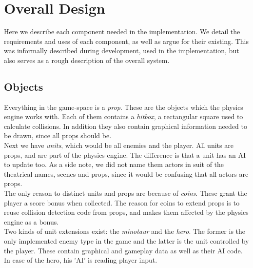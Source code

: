 \chapter{Overall Design} %
Here we describe each component needed in the implementation. We detail the requirements and uses of each component, as well as argue for their existing. This was informally described during development, used in the implementation, but also serves as a rough description of the overall system.

\section{Objects} %
Everything in the game-space is a \emph{prop}. These are the objects which the physics engine works with. Each of them contains a \emph{hitbox}, a rectangular square used to calculate collisions. In addition they also contain graphical information needed to be drawn, since all props should be.\\
Next we have \emph{units}, which would be all enemies and the player. All units are props, and are part of the physics engine. The difference is that a unit has an AI to update too. As a side note, we did not name them actors in suit of the theatrical names, scenes and props, since it would be confusing that all actors are props.\\
The only reason to distinct units and props are because of \emph{coins}. These grant the player a score bonus when collected. The reason for coins to extend props is to reuse collision detection code from props, and makes them affected by the physics engine as a bonus.\\
Two kinds of unit extensions exist: the \emph{minotaur} and the \emph{hero}. The former is the only implemented enemy type in the game and the latter is the unit controlled by the player. These contain graphical and gameplay data as well as their AI code. In case of the hero, his 'AI' is reading player input.

